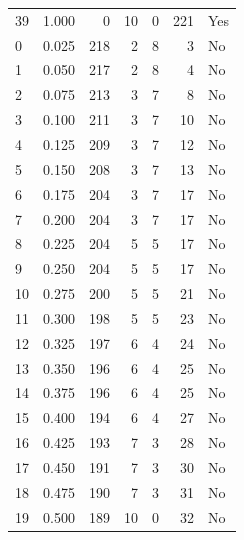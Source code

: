 \documentclass[a4paper,twoside,12pt]{book}
\begin{document}
\begin{appendices}
\begin{table}
\begin{tabular}{lrrrrrl}
		39 &  1.000 &         0 &        10 &               0 &             221 &    Yes \\
		0  &  0.025 &       218 &         2 &               8 &               3 &     No \\
		1  &  0.050 &       217 &         2 &               8 &               4 &     No \\
		2  &  0.075 &       213 &         3 &               7 &               8 &     No \\
		3  &  0.100 &       211 &         3 &               7 &              10 &     No \\
		4  &  0.125 &       209 &         3 &               7 &              12 &     No \\
		5  &  0.150 &       208 &         3 &               7 &              13 &     No \\
		6  &  0.175 &       204 &         3 &               7 &              17 &     No \\
		7  &  0.200 &       204 &         3 &               7 &              17 &     No \\
		8  &  0.225 &       204 &         5 &               5 &              17 &     No \\
		9  &  0.250 &       204 &         5 &               5 &              17 &     No \\
		10 &  0.275 &       200 &         5 &               5 &              21 &     No \\
		11 &  0.300 &       198 &         5 &               5 &              23 &     No \\
		12 &  0.325 &       197 &         6 &               4 &              24 &     No \\
		13 &  0.350 &       196 &         6 &               4 &              25 &     No \\
		14 &  0.375 &       196 &         6 &               4 &              25 &     No \\
		15 &  0.400 &       194 &         6 &               4 &              27 &     No \\
		16 &  0.425 &       193 &         7 &               3 &              28 &     No \\
		17 &  0.450 &       191 &         7 &               3 &              30 &     No \\
		18 &  0.475 &       190 &         7 &               3 &              31 &     No \\
		19 &  0.500 &       189 &        10 &               0 &              32 &     No \\

\end{tabular}
\end{table}
\end{appendices}
\end{document}

